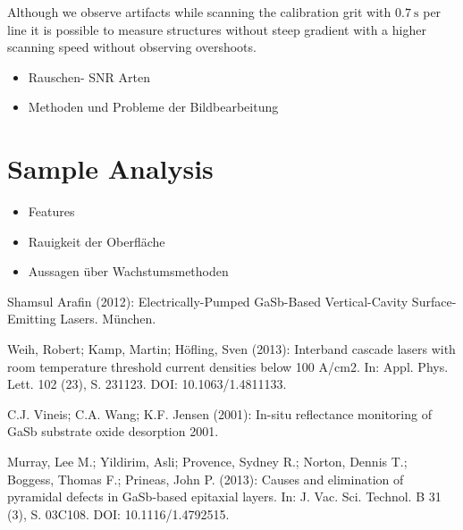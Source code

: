 \documentclass[paper=a4,fontsize=10pt,DIV=18,twocolumn,parskip=half]{scrartcl}
\numberwithin{equation}{section}    %
\begin{document}
Although we observe artifacts while scanning the calibration grit with  $\SI{0.7}{\second}$ per line it is possible to measure structures without steep gradient with a higher scanning speed without observing overshoots.


\begin{itemize}
\item Rauschen- SNR  Arten \\
\item Methoden und Probleme der Bildbearbeitung\\
\end{itemize}

\section{Sample Analysis}

\begin{itemize}
\item Features\\
\item Rauigkeit der Oberfläche\\
\item Aussagen über Wachstumsmethoden\\
\end{itemize}

\begin{thebibliography}{}   

 Shamsul Arafin (2012): Electrically-Pumped GaSb-Based 
Vertical-Cavity Surface-Emitting Lasers. München.

 Weih, Robert; Kamp, Martin; Höfling, Sven (2013): Interband 
cascade lasers with room temperature threshold current densities below 100 
A/cm2. In: Appl. Phys. Lett. 102 (23), S. 231123. DOI: 10.1063/1.4811133.

 C.J. Vineis; C.A. Wang; K.F. Jensen (2001): In-situ reflectance 
monitoring of GaSb substrate oxide desorption 2001.

 Murray, Lee M.; Yildirim, Asli; Provence, Sydney R.; Norton, 
Dennis T.; Boggess, Thomas F.; Prineas, John P. (2013): Causes and elimination 
of pyramidal defects in GaSb-based epitaxial layers. In: J. Vac. Sci. Technol. B 
31 (3), S. 03C108. DOI: 10.1116/1.4792515.
  

\end{thebibliography}
%
%
\onecolumn
\pagestyle{empty}
\end{document}
